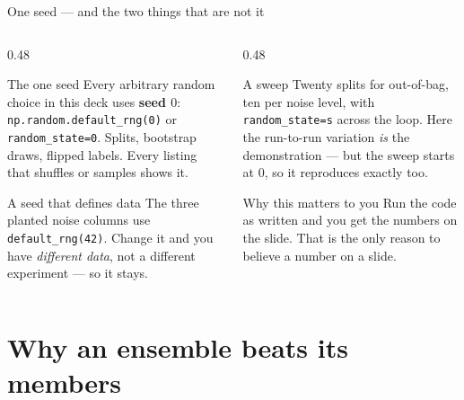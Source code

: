 \documentclass[aspectratio=169]{beamer}
\begin{document}
\begin{frame}[shrink=6]{One seed --- and the two things that are not it}
  \begin{columns}[T]
    \begin{column}{0.48\textwidth}
      \begin{block}{The one seed}
        \small Every arbitrary random choice in this deck uses
        \textbf{seed $0$}: \texttt{np.random.default\_rng(0)} or
        \texttt{random\_state=0}. Splits, bootstrap draws, flipped labels.
        Every listing that shuffles or samples shows it.
      \end{block}
      \begin{alertblock}{A seed that defines data}
        \small The three planted noise columns use
        \texttt{default\_rng(42)}. Change it and you have \emph{different
        data}, not a different experiment --- so it stays.
      \end{alertblock}
    \end{column}
    \begin{column}{0.48\textwidth}
      \begin{block}{A sweep}
        \small Twenty splits for out-of-bag, ten per noise level, with
        \texttt{random\_state=s} across the loop. Here the run-to-run
        variation \emph{is} the demonstration --- but the sweep starts at
        $0$, so it reproduces exactly too.
      \end{block}
      \begin{exampleblock}{Why this matters to you}
        \small Run the code as written and you get the numbers on the slide.
        That is the only reason to believe a number on a slide.
      \end{exampleblock}
    \end{column}
  \end{columns}
\end{frame}

\section[Why ensembles]{Why an ensemble beats its members}
\label{sec:why}
\end{document}
